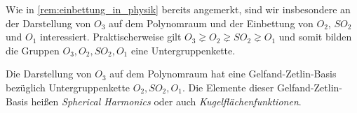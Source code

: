 \begin{remark}
	Wie in \ref{rem:einbettung_in_physik} bereits angemerkt, sind wir insbesondere an der Darstellung von $O_3$ auf dem Polynomraum und der Einbettung von $O_2$, $SO_2$ und $O_1$ interessiert. Praktischerweise gilt $O_3\gneq O_2\gneq SO_2 \gneq O_1$ und somit bilden die Gruppen $O_3, O_2,SO_2,O_1$ eine Untergruppenkette.
\end{remark}

\begin{maintheorem}
	Die Darstellung von $O_3$ auf dem Polynomraum hat eine Gelfand-Zetlin-Basis bezüglich Untergruppenkette $O_2,SO_2,O_1$. Die Elemente dieser Gelfand-Zetlin-Basis heißen \emph{Spherical Harmonics} oder auch \emph{Kugelflächenfunktionen}.
\end{maintheorem}